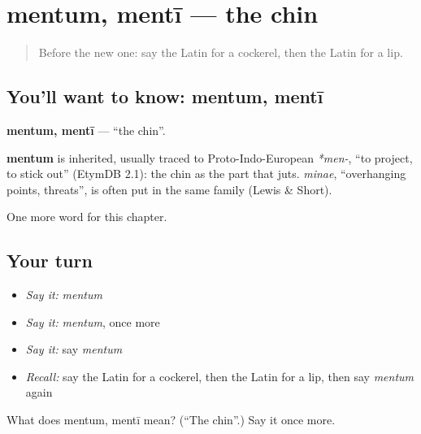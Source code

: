 \section[mentum, mentī]{mentum, mentī — the chin}

\label{lesson:LA-C135-mentum}



\begin{quote}
Before the new one: say the Latin for a cockerel, then the Latin for a lip.
\end{quote}

\subsection*{You'll want to know: mentum, mentī}
\textbf{mentum, mentī} — \textquotedblleft{}the chin\textquotedblright{}.

\begin{cousinweb}
\textbf{mentum} is inherited, usually traced to Proto-Indo-European \emph{*men-}, \textquotedblleft{}to project, to stick out\textquotedblright{} (EtymDB 2.1): the chin as the part that juts. \emph{minae}, \textquotedblleft{}overhanging points, threats\textquotedblright{}, is often put in the same family (Lewis \& Short).
\end{cousinweb}

\begin{grammarlens}[title={What you've built}]
One more word for this chapter.
\end{grammarlens}

\subsection*{Your turn}
\begin{itemize}
\raggedright
  \item \emph{Say it:} \emph{mentum}
  \item \emph{Say it:} \emph{mentum}, once more
  \item \emph{Say it:} say \emph{mentum}
  \item \emph{Recall:} say the Latin for a cockerel, then the Latin for a lip, then say \emph{mentum} again
\end{itemize}

\begin{tcolorbox}[breakable,colback=teal!4,colframe=teal!35!black,title={Before you move on}]
What does mentum, mentī mean? (\textquotedblleft{}The chin\textquotedblright{}.) Say it once more.
\end{tcolorbox}
